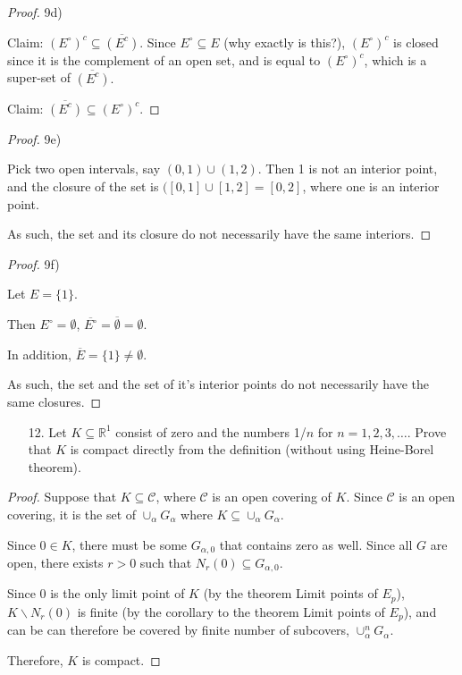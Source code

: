 \documentclass[10pt]{article}
\theoremstyle{definition}
\theoremstyle{plain}
\newcommand{\R}{\mathbb{R}}
\begin{document}
\begin{proof}
9d)

Claim: $(E^\circ)^c \subseteq \overline{(E^c)}$. Since $E^\circ \subseteq E$ (why exactly is this?), $(E^\circ)^c$ is closed since it is the complement of an open set, and is equal to $(E^\circ)^c$, which is a super-set of $\overline{(E^c)}.$

Claim: $\overline{(E^c)} \subseteq (E^\circ)^c$.
\end{proof}

\begin{proof}
9e)

Pick two open intervals, say $(0,1)\cup(1,2)$. Then 1 is not an interior point, and the closure of the set is $([0,1]\cup[1,2] = [0,2]$, where one is an interior point.

As such, the set and its closure do not necessarily have the same interiors.
\end{proof}


\begin{proof}
9f)

Let $E=\{1\}$.

Then $E^\circ = \emptyset$, $\overline{E^\circ} = \overline{\emptyset} = \emptyset$.

In addition, $\overline{E} = \{1\} \neq \emptyset$.

As such, the set and the set of it's interior points do not necessarily have the same closures.
\end{proof}




\pagebreak




\begin{enumerate}
\item[12.] Let $K\subseteq \R^1$ consist of zero and the numbers 1/$n$ for $n=1,2,3,\dots.$ Prove that $K$ is compact directly from the definition (without using Heine-Borel theorem).
\end{enumerate}

\begin{proof}
Suppose that $K\subseteq \mathcal{C}$, where $\mathcal{C}$ is an open covering of $K$. Since $\mathcal{C}$ is an open covering, it is the set of $\cup_\alpha G_\alpha$ where $K\subseteq \cup_\alpha G_\alpha$.

Since $0\in K$, there must be some $G_{\alpha,0}$ that contains zero as well. Since all $G$ are open, there exists $r>0$ such that $N_r (0)\subseteq G_{\alpha,0}$.

Since 0 is the only limit point of $K$ (by the theorem Limit points of $E_p$), $K\backslash N_r(0)$ is finite (by the corollary to the theorem Limit points of $E_p$), and can be can therefore be covered by finite number of subcovers, $\cup_\alpha^n G_\alpha$.

Therefore, $K$ is compact.
\end{proof}
\end{document}
